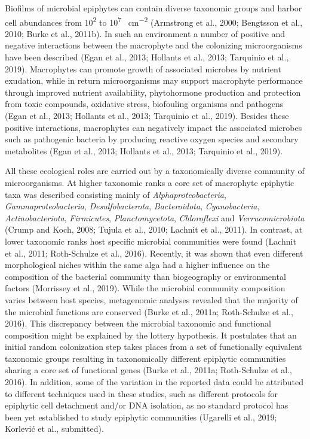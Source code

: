 \documentclass[12pt,]{article}
\begin{document}
Biofilms of microbial epiphytes can contain diverse taxonomic groups and
harbor cell abundances from 10\textsuperscript{2} to
10\textsuperscript{7} \si{\cells\per\cm\squared} (Armstrong et al.,
2000; Bengtsson et al., 2010; Burke et al., 2011b). In such an
environment a number of positive and negative interactions between the
macrophyte and the colonizing microorganisms have been described (Egan
et al., 2013; Hollants et al., 2013; Tarquinio et al., 2019).
Macrophytes can promote growth of associated microbes by nutrient
exudation, while in return microorganisms may support macrophyte
performance through improved nutrient availability, phytohormone
production and protection from toxic compounds, oxidative stress,
biofouling organisms and pathogens (Egan et al., 2013; Hollants et al.,
2013; Tarquinio et al., 2019). Besides these positive interactions,
macrophytes can negatively impact the associated microbes such as
pathogenic bacteria by producing reactive oxygen species and secondary
metabolites (Egan et al., 2013; Hollants et al., 2013; Tarquinio et al.,
2019).

All these ecological roles are carried out by a taxonomically diverse
community of microorganisms. At higher taxonomic ranks a core set of
macrophyte epiphytic taxa was described consisting mainly of
\emph{Alphaproteobacteria}, \emph{Gammaproteobacteria},
\emph{Desulfobacterota}, \emph{Bacteroidota}, \emph{Cyanobacteria},
\emph{Actinobacteriota}, \emph{Firmicutes}, \emph{Planctomycetota},
\emph{Chloroflexi} and \emph{Verrucomicrobiota} (Crump and Koch, 2008;
Tujula et al., 2010; Lachnit et al., 2011). In contrast, at lower
taxonomic ranks host specific microbial communities were found (Lachnit
et al., 2011; Roth-Schulze et al., 2016). Recently, it was shown that
even different morphological niches within the same alga had a higher
influence on the composition of the bacterial community than
biogeography or environmental factors (Morrissey et al., 2019). While
the microbial community composition varies between host species,
metagenomic analyses revealed that the majority of the microbial
functions are conserved (Burke et al., 2011a; Roth-Schulze et al.,
2016). This discrepancy between the microbial taxonomic and functional
composition might be explained by the lottery hypothesis. It postulates
that an initial random colonization step takes places from a set of
functionally equivalent taxonomic groups resulting in taxonomically
different epiphytic communities sharing a core set of functional genes
(Burke et al., 2011a; Roth-Schulze et al., 2016). In addition, some of
the variation in the reported data could be attributed to different
techniques used in these studies, such as different protocols for
epiphytic cell detachment and/or DNA isolation, as no standard protocol
has been yet established to study epiphytic communities (Ugarelli et
al., 2019; Korlević et al., submitted).
\end{document}
